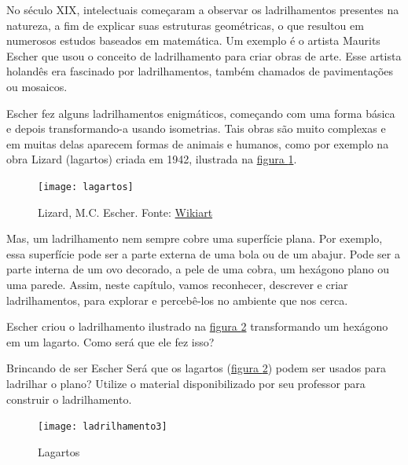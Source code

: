 No século XIX, intelectuais começaram a observar os ladrilhamentos presentes na natureza, a fim de explicar suas estruturas geométricas, o que resultou em numerosos estudos baseados em matemática. Um exemplo é  o artista Maurits Escher que usou o conceito de ladrilhamento para criar obras de arte. Esse artista holandês era fascinado por ladrilhamentos, também chamados de pavimentações ou mosaicos. 

Escher fez alguns ladrilhamentos enigmáticos, começando com uma forma básica e depois transformando-a usando isometrias.  Tais obras são muito complexas e em muitas delas aparecem formas de  animais e humanos, como por exemplo na obra  Lizard (lagartos) criada em 1942, ilustrada na \hyperref[lad-fig-1]{figura \ref{lad-fig-1}}.

\begin{figure}[H]
\centering
\texttt{[image: lagartos]}

\caption{Lizard, M.C. Escher. Fonte: \href{https://www.wikiart.org/en/m-c-escher/lizard-1}{Wikiart}}
\label{lad-fig-1}
\end{figure}


Mas, um ladrilhamento nem sempre cobre uma superfície plana. Por exemplo, essa  superfície pode ser a parte externa de uma bola ou de um abajur. Pode ser  a parte interna de um ovo decorado, a pele de uma cobra, um hexágono plano ou uma parede. Assim, neste capítulo, vamos reconhecer, descrever e criar ladrilhamentos, para explorar e percebê-los no ambiente que nos cerca.

\begin{reflection}
Escher criou o ladrilhamento ilustrado na \hyperref[lizard]{figura \ref{lizard}}  transformando um hexágono em um lagarto. Como será que ele fez isso?
\end{reflection}



\begin{task}{Brincando de ser Escher} \label{at_brinc}
Será que os lagartos (\hyperref[lizard]{figura \ref{lizard}}) podem ser usados para ladrilhar o plano? 
Utilize o material disponibilizado por seu professor para construir o ladrilhamento.


\begin{figure}[H]
\centering
\texttt{[image: ladrilhamento3]}
\caption{Lagartos}
\label{lizard}
\end{figure}
\end{task}


